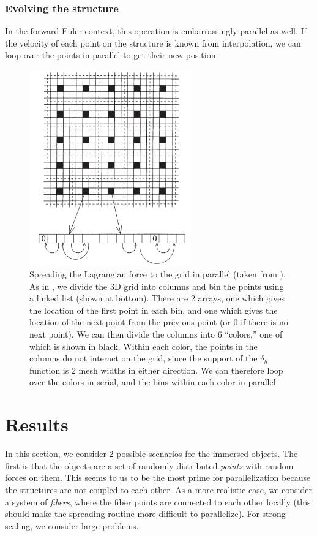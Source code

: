 \documentclass[]{article}
\begin{document}
\subsubsection{Evolving the structure}
In the forward Euler context, this operation is embarrassingly parallel as well. If the velocity of each point on the structure is known from interpolation, we can loop over the points in parallel to get their new position. 

\begin{figure}
\centering     
\includegraphics[width=70mm]{PeskinMcQueen.png}
\caption{Spreading the Lagrangian force to the grid in parallel (taken from \cite{mcqueen}). As in \cite{mcqueen}, we divide the 3D grid into columns and bin the points using a linked list (shown at bottom). There are 2 arrays, one which gives the location of the first point in each bin, and one which gives the location of the next point from the previous point (or 0 if there is no next point). We can then divide the columns into 6 ``colors,'' one of which is shown in black. Within each color, the points in the columns do not interact on the grid, since the support of the $\delta_h$ function is 2 mesh widths in either direction. We can therefore loop over the colors in serial, and the bins within each color in parallel. }
\label{fig:parspread}
\end{figure}


\section{Results}
In this section, we consider 2 possible scenarios for the immersed objects. The first is that the objects are a set of randomly distributed \textit{points} with random forces on them. This seems to us to be the most prime for parallelization because the structures are not coupled to each other. As a more realistic case, we consider a system of \textit{fibers}, where the fiber points are connected to each other locally (this should make the spreading routine more difficult to parallelize). For strong scaling, we consider large problems.
\end{document}
